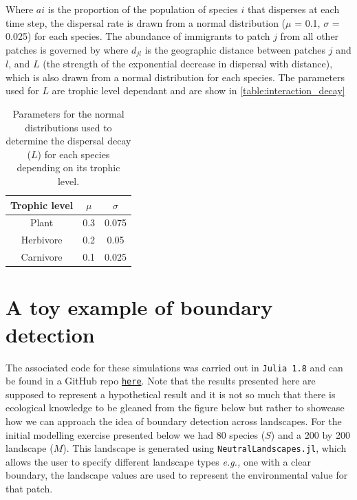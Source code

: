 Where $ai$ is the proportion of the population of species $i$ that disperses at each time step, the dispersal rate is drawn from a normal distribution ($\mu$ = 0.1, $\sigma$ = 0.025) for each species. The abundance of immigrants to patch $j$ from all other patches is governed by where $d_{jl}$ is the geographic distance between patches $j$ and $l$, and $L$ (the strength of the exponential decrease in dispersal with distance), which is also drawn from a normal distribution for each species. The parameters used for $L$ are trophic level dependant and are show in \autoref{table:interaction_decay}

\begin{table}[h!]
\centering
\begin{tabular}{||c c c||} 
 \hline
Trophic level & $\mu$ & $\sigma$ \\ [0.5ex] \hline\hline
 Plant & 0.3 & 0.075 \\ 
 Herbivore & 0.2 & 0.05 \\
 Carnivore & 0.1 & 0.025 \\ [1ex] 
 \hline
\end{tabular}
\caption{Parameters for the normal distributions used to determine the dispersal
decay ($L$) for each species depending on its trophic level.}
\label{table:interaction_decay}
\end{table}

\section{A toy example of boundary detection}

The associated code for these simulations was carried out in \texttt{Julia 1.8} \cite{Bezanson2017JulFre} and can be found in a GitHub repo \href{https://github.com/PoisotLab/Omnomnomivores}{\texttt{here}}. Note that the results presented here are supposed to represent a hypothetical result and it is not so much that there is ecological knowledge to be gleaned from the figure below but rather to showcase how we can approach the idea of boundary detection across landscapes. For the initial modelling exercise presented below we had 80 species ($S$) and a 200 by 200 landscape ($M$). This landscape is generated using \texttt{NeutralLandscapes.jl}, which allows the user to specify different landscape types \emph{e.g.,} one with a clear boundary, the landscape values are used to represent the environmental value for that patch.

